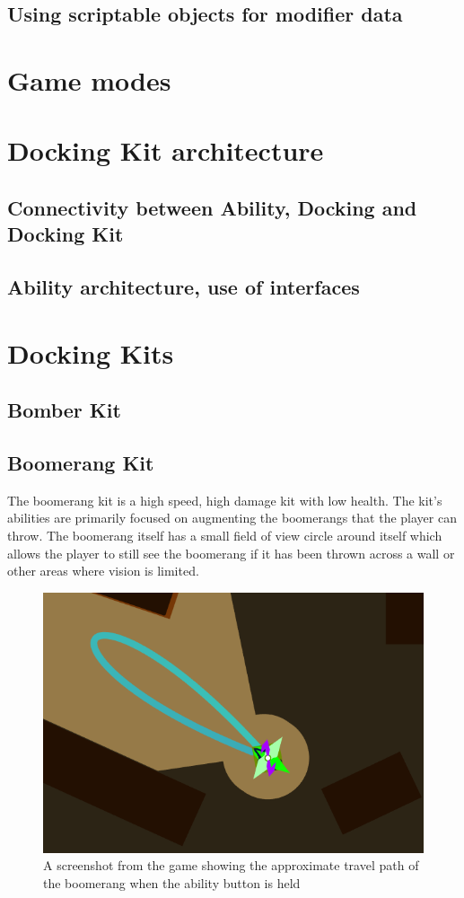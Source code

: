 \subsection{Using scriptable objects for modifier data}

\section{Game modes}

\section{Docking Kit architecture}
\subsection{Connectivity between Ability, Docking and Docking Kit}
\subsection{Ability architecture, use of interfaces}

\section{Docking Kits}
\label{sec:dockingKits}
\subsection{Bomber Kit}
\subsection{Boomerang Kit}
The boomerang kit is a high speed, high damage kit with low health. The kit's abilities are primarily focused on augmenting the boomerangs that the player can throw. The boomerang itself has a small field of view circle around itself which allows the player to still see the boomerang if it has been thrown across a wall or other areas where vision is limited. 

\begin{figure}[tbph]  %
  \centering
  \includegraphics[width=.75\textwidth]{images/boomerangKitLineRenderer}
  \caption[Approximate travel path of the boomerang]{A screenshot from the game showing the approximate travel path of the boomerang when the ability button is held}
  \label{fig:boomerangLineRenderer}
\end{figure}

